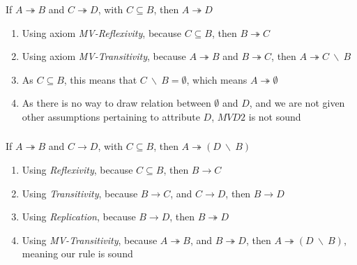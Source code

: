 \documentclass[letterpaper]{article}
\theoremstyle{plain}
\theoremstyle{definition}
\theoremstyle{remark}
\begin{document}
\subsubsection{}
\begin{center}
    If $A\twoheadrightarrow B$ and $C\twoheadrightarrow D$, with $C\subseteq B$, then $A\twoheadrightarrow D$
\end{center}
\begin{enumerate}
    \item Using axiom \textit{MV-Reflexivity}, because $C\subseteq B$, then $B\twoheadrightarrow C$
    \item Using axiom \textit{MV-Transitivity}, because $A\twoheadrightarrow B$ and $B\twoheadrightarrow C$, then $A\twoheadrightarrow C~\backslash~B$
    \item As $C\subseteq B$, this means that $C~\backslash~B=\emptyset$, which means $A\twoheadrightarrow \emptyset$
    \item As there is no way to draw relation between $\emptyset$ and $D$, and we are not given other assumptions pertaining to attribute $D$, $MVD2$ is not sound
\end{enumerate}
\subsubsection{}
\begin{center}
    If $A\twoheadrightarrow B$ and $C\rightarrow D$, with $C\subseteq B$, then $A\twoheadrightarrow (D~\backslash~B)$
\end{center}
\begin{enumerate}
    \item Using \textit{Reflexivity}, because $C\subseteq B$, then $B\rightarrow C$
    \item Using \textit{Transitivity}, because $B\rightarrow C$, and $C\rightarrow D$, then $B\rightarrow D$
    \item Using \textit{Replication}, because $B\rightarrow D$, then $B\twoheadrightarrow D$
    \item Using \textit{MV-Transitivity}, because $A\twoheadrightarrow B$, and $B\twoheadrightarrow D$, then $A\twoheadrightarrow (D~\backslash~B)$, meaning our rule is sound
\end{enumerate}
\end{document}
